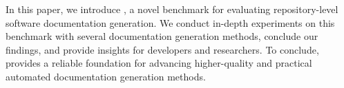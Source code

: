 In this paper, we introduce \benchmark, a novel benchmark for evaluating repository-level software documentation generation. We conduct in-depth experiments on this benchmark with several documentation generation methods, conclude our findings, and provide insights for developers and researchers.
To conclude, \benchmark provides a reliable foundation for advancing higher-quality and practical automated documentation generation methods.


